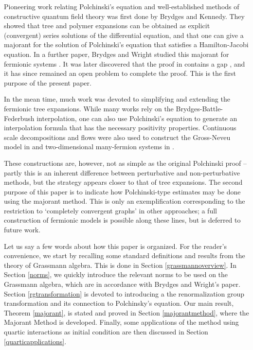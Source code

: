 \documentclass[12pt,twoside]{amsart}
\numberwithin{equation}{section}
\begin{document}
Pioneering work relating Polchinski's equation and well-established methods of constructive quantum field theory was first done by Brydges and Kennedy. They showed that tree and polymer expansions can be obtained as explicit (convergent) series solutions of the differential equation, and that one can give a majorant for the solution of Polchinski's equation that satisfies a Hamilton-Jacobi equation. In a further paper, Brydges and Wright studied this majorant for fermionic systems \cite{BryWri}. It was later discovered that the proof in \cite{BryWri} contains a gap \cite{BryWriErr}, and it has since remained an open problem to complete the proof. This is the first purpose of the present paper. 

In the mean time, much work was devoted to simplifying and extending the fermionic tree expansions. While many works rely on the Brydges-Battle-Federbush interpolation, one can also use Polchinski's equation to generate an interpolation formula that has the necessary positivity properties. Continuous scale decompositions and flows were also used to construct the Gross-Neveu model in \cite{DR-GN} and two-dimensional many-fermion systems in \cite{DR1,DR2}. 

These constructions are, however, not as simple as the original Polchinski proof -- partly this is an inherent difference between perturbative and non-perturbative methods, but the strategy appears closer to that of tree expansions. The second purpose of this paper is to indicate how Polchinski-type estimates may be done using the majorant method. This is only an exemplification corresponding to the restriction to `completely convergent graphs' in other approaches; a full construction of fermionic models is possible along these lines, but is deferred to future work. 

Let us say a few words about how this paper is organized. For the reader's convenience, we start by recalling some standard definitions and results from the theory of Grassmann algebra. This is done in Section \ref{grassmannoverview}. In Section \ref{norms}, we quickly introduce the relevant norms to be used on the Grassmann algebra, which are in accordance with Brydges and Wright's paper. Section \ref{rgtransformation} is devoted to introducing a the renormalization group transformation and its connection to Polchinsky's equation. Our main result, Theorem \ref{majorant}, is stated and proved in Section \ref{majorantmethod}, where the Majorant Method is developed. Finally, some applications of the method using quartic interactions as initial condition are then discussed in Section \ref{quarticapplications}. 
\end{document}
